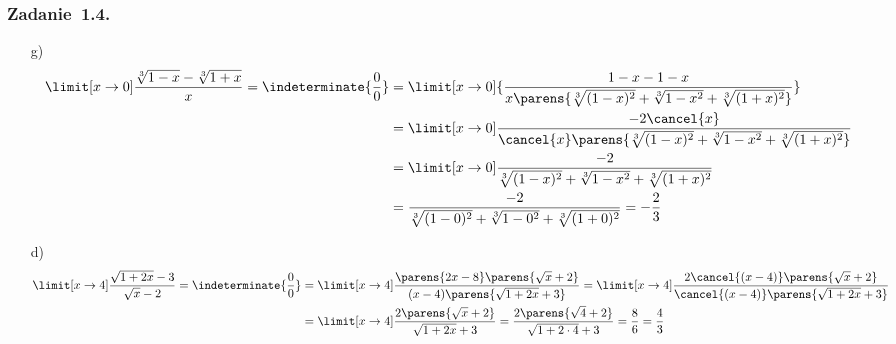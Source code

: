 \subsubsection*{Zadanie~1.4.}
\begin{itemize}
    \item[g)]
        \begin{equation*}
            \begin{split}
                \limit[x \to 0] \frac{\sqrt[3]{1 - x} - \sqrt[3]{1 + x}}{x}
                = \indeterminate{\frac{0}{0}}
                &= \limit[x \to 0]{\frac{1 - x - 1 - x}{x \parens{\sqrt[3]{(1 - x)^2} + \sqrt[3]{1 - x^2} + \sqrt[3]{(1 + x)^2}}}}\\
                &= \limit[x \to 0] \frac{-2\cancel{x}}{\cancel{x} \parens{\sqrt[3]{(1 - x)^2} + \sqrt[3]{1 - x^2} + \sqrt[3]{(1 + x)^2}}}\\
                &= \limit[x \to 0] \frac{-2}{\sqrt[3]{(1 - x)^2} + \sqrt[3]{1 - x^2} + \sqrt[3]{(1 + x)^2}}\\
                &= \frac{-2}{\sqrt[3]{(1 - 0)^2} + \sqrt[3]{1 - 0^2} + \sqrt[3]{(1 + 0)^2}}
                = -\frac{2}{3}
            \end{split}
        \end{equation*}
    \item[d)]
        \begin{equation*}
            \begin{split}
                \limit[x \to 4] \frac{\sqrt{1 + 2x} - 3}{\sqrt{x} - 2}
                    = \indeterminate{\frac{0}{0}}
                    &= \limit[x \to 4] \frac{\parens{2x - 8} \parens{\sqrt{x} + 2}}{(x - 4) \parens{\sqrt{1 + 2x} + 3}}
                    = \limit[x \to 4] \frac{2\cancel{(x - 4)}\parens{\sqrt{x} + 2}}{\cancel{(x - 4)} \parens{\sqrt{1 + 2x} + 3}}\\
                    &= \limit[x \to 4] \frac{2\parens{\sqrt{x} + 2}}{\sqrt{1 + 2x} + 3}
                    = \frac{2\parens{\sqrt{4} + 2}}{\sqrt{1 + 2 \cdot 4} + 3}
                    = \frac{8}{6}
                    = \frac{4}{3}
            \end{split}
        \end{equation*}
\end{itemize}
